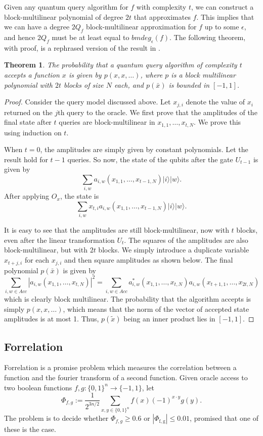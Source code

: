 \documentclass[12pt]{report}
\newtheorem{theorem}{Theorem}
\begin{document}
Given any quantum query algorithm for $f$ with complexity $t$, we can construct a block-multilinear polynomial of degree $2t$ that approximates $f$. This implies that we can have a degree $2Q_f$ block-multilinear approximation for $f$ up to some $\epsilon$, and hence $2Q_f$ must be at least equal to $bmdeg_\epsilon(f)$. The following theorem, with proof, is a rephrased version of the result in \cite{paper1}.
\begin{theorem}
The probability that a quantum query algorithm of complexity $t$ accepts a function $x$ is given by $p(x, x, \ldots)$, where $p$ is a block multilinear polynomial with $2t$ blocks of size $N$ each, and $p(\bar{x})$ is bounded in $[-1,1]$.
\end{theorem}
\begin{proof}
Consider the query model discussed above. Let $x_{j,i}$ denote the value of $x_i$ returned on the $j$th query to the oracle. We first prove that the amplitudes of the final state after $t$ queries are block-multilinear in $x_{1,1}, \ldots, x_{t,N}$. We prove this using induction on $t$.

When $t=0$, the amplitudes are simply given by constant polynomials. Let the result hold for $t-1$ queries. So now, the state of the qubits after the gate $U_{t-1}$ is given by
$$\sum_{i,w} a_{i,w}(x_{1,1}, \ldots, x_{t-1,N}) |i\rangle |w\rangle.$$
After applying $O_x$, the state is
$$\sum_{i,w} x_{t,i} a_{i,w}(x_{1,1}, \ldots, x_{t-1,N}) |i\rangle |w\rangle.$$

It is easy to see that the amplitudes are still block-multilinear, now with $t$ blocks, even after the linear transformation $U_t$. The squares of the amplitudes are also block-multilinear, but with $2t$ blocks. We simply introduce a duplicate variable $x_{t+j,i}$ for each $x_{j,i}$ and then square amplitudes as shown below. The final polynomial $p(\bar{x})$ is given by
$$\sum_{i,w \in Acc} |a_{i,w}(x_{1,1}, \ldots, x_{t,N})|^2 = \sum_{i,w \in Acc} a^*_{i,w}(x_{1,1}, \ldots, x_{t,N}) a_{i,w}(x_{t+1,1}, \ldots, x_{2t,N})$$
which is clearly block multilinear. The probability that the algorithm accepts is simply $p(x, x, \ldots)$, which means that the norm of the vector of accepted state amplitudes is at most 1. Thus, $p(\tilde{x})$ being an inner product lies in $[-1,1]$.
\end{proof}


\subsection{Forrelation}
Forrelation is a promise problem which measures the correlation between a function and the fourier transform of a second function. Given oracle access to two boolean functions $f,g\colon \{0,1\}^{n} \rightarrow  \{-1,1\}$, let
\begin{equation}
\Phi_{f, g} := \frac{1}{2^{3n/2}} \sum_{x, y \in \{0,1\}^{n}} f(x)(-1)^{x \cdot y} g(y).
\end{equation}
The problem is to decide whether $\Phi_{f,g} \geq 0.6$ or $\left|\Phi_{\mathrm{f}, \mathrm{g}}\right| \leq 0.01$, promised that one of these is the case.
\end{document}
